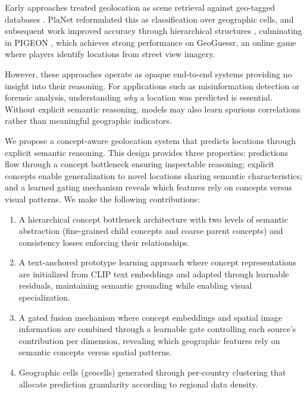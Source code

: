 \documentclass{uva-inf-article}
\begin{document}
Early approaches treated geolocation as scene retrieval against geo-tagged databases \parencite{hays2008im2gps}. PlaNet \parencite{weyand2016planet} reformulated this as classification over geographic cells, and subsequent work improved accuracy through hierarchical structures \parencite{muller2018geolocation, seo2018cpl}, culminating in PIGEON \parencite{haas2024pigeon}, which achieves strong performance on GeoGuessr, an online game where players identify locations from street view imagery.

However, these approaches operate as opaque end-to-end systems providing no insight into their reasoning. For applications such as misinformation detection or forensic analysis, understanding \textit{why} a location was predicted is essential. Without explicit semantic reasoning, models may also learn spurious correlations rather than meaningful geographic indicators.

We propose a concept-aware geolocation system that predicts locations through explicit semantic reasoning. This design provides three properties: predictions flow through a concept bottleneck ensuring inspectable reasoning; explicit concepts enable generalization to novel locations sharing semantic characteristics; and a learned gating mechanism reveals which features rely on concepts versus visual patterns. We make the following contributions:
\begin{enumerate}
    \setlength{\itemsep}{0pt}
    \item A hierarchical concept bottleneck architecture with two levels of semantic abstraction (fine-grained child concepts and coarse parent concepts) and consistency losses enforcing their relationships.
    \item A text-anchored prototype learning approach where concept representations are initialized from CLIP text embeddings and adapted through learnable residuals, maintaining semantic grounding while enabling visual specialization.
    \item A gated fusion mechanism where concept embeddings and spatial image information are combined through a learnable gate controlling each source's contribution per dimension, revealing which geographic features rely on semantic concepts versus spatial patterns.
    \item Geographic cells (geocells) generated through per-country clustering that allocate prediction granularity according to regional data density.
\end{enumerate}
\end{document}
